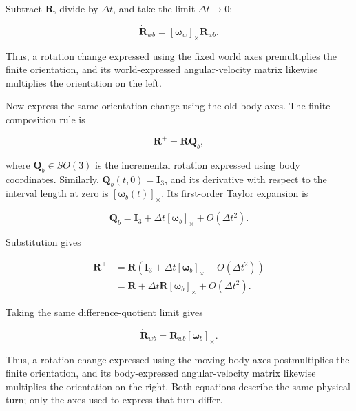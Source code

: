 \documentclass[
  australian,
  12pt,
  letterpaper,
  DIV=11,
  numbers=noendperiod,
  twoside]{scrreprt}
\begin{document}
Subtract \(\mathbf R\), divide by \(\Delta t\), and take the limit
\(\Delta t\to0\):

\[
\boxed{
\dot{\mathbf R}_{wb}
=
[\boldsymbol\omega_w]_\times\mathbf R_{wb}
}.
\]

Thus, a rotation change expressed using the fixed world axes
premultiplies the finite orientation, and its world-expressed
angular-velocity matrix likewise multiplies the orientation on the left.

Now express the same orientation change using the old body axes. The
finite composition rule is

\[
\mathbf R^+
=
\mathbf R\mathbf Q_b,
\]

where \(\mathbf Q_b\in SO(3)\) is the incremental rotation expressed
using body coordinates. Similarly, \(\mathbf Q_b(t,0)=\mathbf I_3\), and
its derivative with respect to the interval length at zero is
\([\boldsymbol\omega_b(t)]_\times\). Its first-order Taylor expansion is

\[
\mathbf Q_b
=
\mathbf I_3
+
\Delta t[\boldsymbol\omega_b]_\times
+
O(\Delta t^2).
\]

Substitution gives

\[
\begin{aligned}
\mathbf R^+
&=
\mathbf R
\left(
\mathbf I_3
+
\Delta t[\boldsymbol\omega_b]_\times
+
O(\Delta t^2)
\right)\\
&=
\mathbf R
+
\Delta t\mathbf R[\boldsymbol\omega_b]_\times
+
O(\Delta t^2).
\end{aligned}
\]

Taking the same difference-quotient limit gives

\[
\boxed{
\dot{\mathbf R}_{wb}
=
\mathbf R_{wb}[\boldsymbol\omega_b]_\times
}.
\]

Thus, a rotation change expressed using the moving body axes
postmultiplies the finite orientation, and its body-expressed
angular-velocity matrix likewise multiplies the orientation on the
right. Both equations describe the same physical turn; only the axes
used to express that turn differ.
\end{document}
